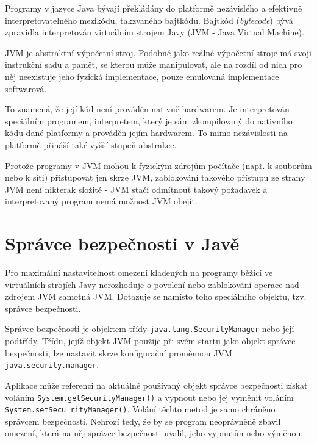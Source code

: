 Programy v jazyce Java bývají překládány do platformě nezávislého a efektivně interpretovatelného mezikódu, takzvaného bajtkódu.
Bajtkód ({\it bytecode}) bývá zpravidla interpretován virtuálním strojem Javy (JVM - Java Virtual Machine).
\cite{jvmIntro}

JVM je abstraktní výpočetní stroj. Podobně jako reálné výpočetní stroje má svoji instrukční sadu a paměť, se kterou může manipulovat, ale na rozdíl od nich pro něj neexistuje jeho fyzická implementace, pouze emulovaná implementace softwarová.
\cite{jvmIntro}

To znamená, že její kód není prováděn nativně hardwarem. Je interpretován speciálním programem, interpretem, který je sám zkompilovaný do nativního kódu dané platformy a prováděn jejím hardwarem.
To mimo nezávislosti na platformě přináší také vyšší stupeň abstrakce.
\cite{jvmIntro}

Protože programy v JVM mohou k fyzickým zdrojům počítače (např. k souborům nebo k síti) přistupovat jen skrze JVM, zablokování takového přístupu ze strany JVM není nikterak složité - JVM stačí odmítnout takový požadavek a interpretovaný program nemá možnost JVM obejít.

\section{Správce bezpečnosti v Javě} \label{securityManager}

Pro maximální nastavitelnost omezení kladených na programy běžící ve virtuálních strojích Javy nerozhoduje o povolení nebo zablokování operace nad zdrojem JVM samotná JVM. Dotazuje se namísto toho speciálního objektu, tzv. správce bezpečnosti. \cite{tutorialsTSM}

Správce bezpečnosti je objektem třídy {\tt java.lang.SecurityManager} nebo její podtřídy.
Třídu, jejíž objekt JVM použije při svém startu jako objekt správce bezpečnosti, lze nastavit skrze konfigurační proměnnou JVM {\tt java.security.manager}. \cite{javaSecurityArch}

Aplikace může referenci na aktuálně používaný objekt správce bezpečnosti získat voláním {\tt System.getSecurityManager()} a vypnout nebo jej vyměnit voláním {\tt System.setSecu rityManager()}. Volání těchto metod je samo chráněno správcem bezpečnosti.
Nehrozí tedy, že by se program neoprávněně zbavil omezení, která na něj správce bezpečnosti uvalil, jeho vypnutím nebo výměnou.
\cite{tutorialsTSM}

